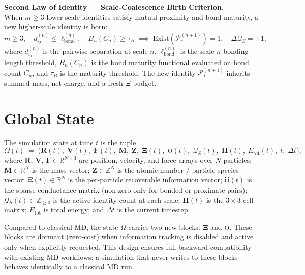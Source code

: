 \documentclass[11pt,a4paper]{article}
\newcommand{\Pid}{\mathscr{P}}
\newcommand{\Rec}{\Xi}
\newcommand{\Cond}{\mho}
\newcommand{\Quota}{\mathcal{Q}}
\newcommand{\lbond}{\ell_{\mathrm{bond}}}
\begin{document}
\begin{smlaw}
\textbf{Second Law of Identity --- Scale-Coalescence Birth Criterion.}\\[4pt]
When $m \geq 3$ lower-scale identities satisfy mutual proximity and bond
maturity, a new higher-scale identity is born:
\[
  m \geq 3,\quad
  d_{ij}^{(n)} \leq \lbond^{(n)},\quad
  B_n\!\left(C_n\right) \geq \tau_B
  \;\implies\;
  \mathrm{Exist}\!\left(\Pid_*^{(n+1)}\right) = 1,\quad
  \Delta\Quota_S = +1 ,
\]
where $d_{ij}^{(n)}$ is the pairwise separation at scale $n$,
$\lbond^{(n)}$ is the scale-$n$ bonding length threshold,
$B_n(C_n)$ is the bond maturity functional evaluated on bond count $C_n$,
and $\tau_B$ is the maturity threshold.  The new identity $\Pid_*^{(n+1)}$
inherits summed mass, net charge, and a fresh $\Rec$ budget.
\end{smlaw}

\section{Global State}\label{sec:global}

The simulation state at time $t$ is the tuple
\[
  \Omega(t) \;=\;
  \bigl(
    \mathbf{R}(t),\;
    \mathbf{V}(t),\;
    \mathbf{F}(t),\;
    \mathbf{M},\;
    \mathbf{Z},\;
    \boldsymbol{\Rec}(t),\;
    \boldsymbol{\Cond}(t),\;
    \Quota_S(t),\;
    \mathbf{H}(t),\;
    E_{\mathrm{tot}}(t),\;
    t,\;
    \Delta t
  \bigr) ,
\]
where $\mathbf{R}$, $\mathbf{V}$, $\mathbf{F} \in \mathbb{R}^{N \times 3}$
are position, velocity, and force arrays over $N$ particles;
$\mathbf{M} \in \mathbb{R}^N$ is the mass vector;
$\mathbf{Z} \in \mathbb{Z}^N$ is the atomic-number / particle-species vector;
$\boldsymbol{\Rec}(t) \in \mathbb{R}^N$ is the per-particle recoverable
information vector;
$\boldsymbol{\Cond}(t)$ is the sparse conductance matrix (non-zero only for
bonded or proximate pairs);
$\Quota_S(t) \in \mathbb{Z}_{\geq 0}$ is the active identity count at each
scale;
$\mathbf{H}(t)$ is the $3\times3$ cell matrix;
$E_{\mathrm{tot}}$ is total energy; and $\Delta t$ is the current timestep.

\noindent
Compared to classical MD, the state $\Omega$ carries two new blocks:
$\boldsymbol{\Rec}$ and $\boldsymbol{\Cond}$.  These blocks are dormant
(zero-cost) when information tracking is disabled and active only when
explicitly requested.  This design ensures full backward compatibility with
existing MD workflows: a simulation that never writes to these blocks
behaves identically to a classical MD run.
\end{document}
